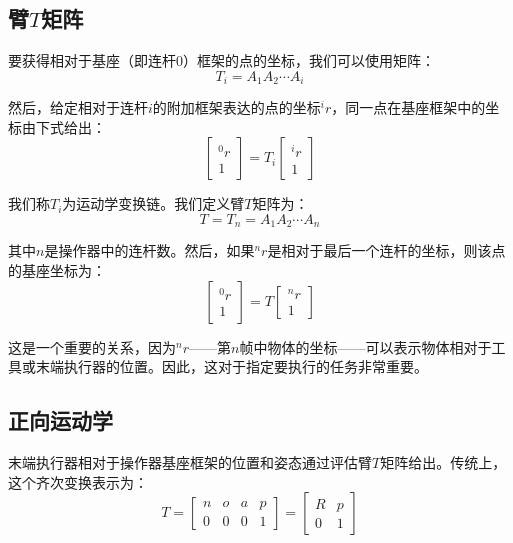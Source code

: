 \documentclass[UTF8,a4paper]{ctexart}
\begin{document}
\subsection{臂$T$矩阵}

要获得相对于基座（即连杆0）框架的点的坐标，我们可以使用矩阵：
\begin{equation}
T_i = A_1 A_2 \cdots A_i
\tag{A.2.7}
\end{equation}

然后，给定相对于连杆$i$的附加框架表达的点的坐标${}^ir$，同一点在基座框架中的坐标由下式给出：
\begin{equation}
\begin{bmatrix} {}^0r \\ 1 \end{bmatrix} = T_i \begin{bmatrix} {}^ir \\ 1 \end{bmatrix}
\tag{A.2.8}
\end{equation}

我们称$T_i$为运动学变换链。我们定义臂$T$矩阵为：
\begin{equation}
T = T_n = A_1 A_2 \cdots A_n
\tag{A.2.9}
\end{equation}

其中$n$是操作器中的连杆数。然后，如果${}^nr$是相对于最后一个连杆的坐标，则该点的基座坐标为：
\begin{equation}
\begin{bmatrix} {}^0r \\ 1 \end{bmatrix} = T \begin{bmatrix} {}^nr \\ 1 \end{bmatrix}
\tag{A.2.10}
\end{equation}

这是一个重要的关系，因为${}^nr$——第$n$帧中物体的坐标——可以表示物体相对于工具或末端执行器的位置。因此，这对于指定要执行的任务非常重要。

\subsection{正向运动学}

末端执行器相对于操作器基座框架的位置和姿态通过评估臂$T$矩阵给出。传统上，这个齐次变换表示为：
\begin{equation}
T = \begin{bmatrix} n & o & a & p \\ 0 & 0 & 0 & 1 \end{bmatrix} = \begin{bmatrix} R & p \\ 0 & 1 \end{bmatrix}
\tag{A.2.11}
\end{equation}
\end{document}

